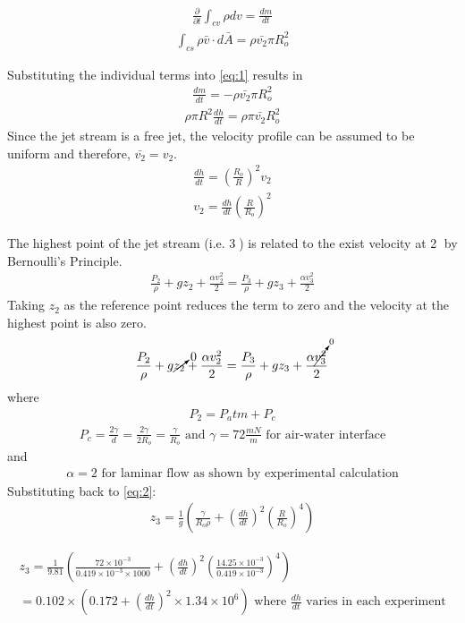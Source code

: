 \documentclass{article}
\begin{document}
\begin{align*}
\frac{\partial}{\partial{t}} \int_{cv} \rho dv = \frac{dm}{dt}
\end{align*}
\begin{align*}
\int_{cs} \rho \bar{v} \cdot d\bar{A} = \rho \bar{v_2} \pi R_o^2
\end{align*}

Substituting the individual terms into \eqref{eq:1} results in
\begin{align*}
\frac{dm}{dt} = - \rho \bar{v_2} \pi R_o^2
\end{align*}
\begin{align*}
\rho \pi R^2 \frac{dh}{dt} = \rho \pi \bar{v_2} R_o^2
\end{align*}
Since the jet stream is a free jet, the velocity profile can be assumed to be uniform and therefore, $\bar{v_2} = v_2$.
\begin{align*}
\frac{dh}{dt} = (\frac{R_o}{R})^2 v_2
\end{align*}
\begin{align}
v_2 = \frac{dh}{dt} (\frac{R}{R_o})^2
\end{align}

The highest point of the jet stream (i.e. \textcircled{3}) is related to the exist velocity at \textcircled{2} by Bernoulli's Principle.
\begin{align*}
\frac{P_2}{\rho} + g z_2 + \frac{\alpha v_2^2}{2} = \frac{P_3}{\rho} + g z_3 + \frac{\alpha v_3^2}{2} 
\end{align*}
Taking $z_2$ as the reference point reduces the term to zero and the velocity at the highest point is also zero.
\begin{align}
\frac{P_2}{\rho} + g \cancelto{0}{z_2} + \frac{\alpha v_2^2}{2} = \frac{P_3}{\rho} + g z_3 + \frac{\alpha \cancelto{0}{v_3^2}}{2} \label{eq:2}  
\end{align}
where
\begin{align*}
P_2 = P_atm + P_c
\end{align*}
\begin{align*}
P_c = \frac{2\gamma}{d} = \frac{2\gamma}{2 R_o} = \frac{\gamma}{R_o}  \textrm{ and } \gamma = 72 \frac{mN}{m}  \textrm{ for air-water interface}
\end{align*}
and 
\begin{align*}
\alpha = 2 \textrm{ for laminar flow as shown by experimental calculation}
\end{align*}
Substituting back to \eqref{eq:2}:
\begin{align*}
z_3 = \frac{1}{g} (\frac{\gamma}{R_o \rho} + (\frac{dh}{dt})^2(\frac{R}{R_o})^4)  
\end{align*}

\begin{multline*}
z_3 = \frac{1}{9.81} (\frac{72\times10^{-3}}{0.419\times10^{-3} \times 1000} + (\frac{dh}{dt})^2(\frac{14.25\times10^{-3}}{0.419\times10^{-3}})^4)\\= 0.102\times(0.172 + (\frac{dh}{dt})^2 \times1.34\times{10^6}) \textrm{ where $\frac{dh}{dt}$ varies in each experiment}
\end{multline*}




\setlength{\parindent}{1cm}
\end{document}
